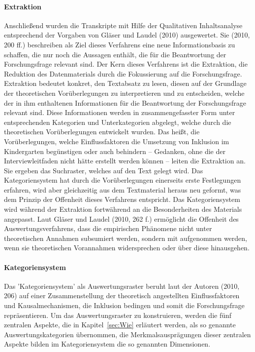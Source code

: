 \paragraph{Extraktion} Anschließend wurden die Transkripte mit Hilfe der Qualitativen Inhaltsanalyse entsprechend der Vorgaben von Gläser und Laudel (2010) ausgewertet. Sie (2010, 200 ff.) beschreiben als  Ziel dieses Verfahrens eine neue Informationsbasis zu schaffen, die nur noch die Aussagen enthält, die für die Beantwortung der Forschungsfrage relevant sind. Der Kern dieses Verfahrens ist die Extraktion, die Reduktion des Datenmaterials durch die Fokussierung auf die Forschungsfrage. Extraktion bedeutet konkret, den Textabsatz zu lesen, diesen auf der Grundlage der theoretischen Vorüberlegungen zu interpretieren und zu entscheiden, welche der in ihm enthaltenen Informationen für die Beantwortung der Forschungsfrage relevant sind. Diese Informationen werden in zusammengefasster Form unter  entsprechenden Kategorien und Unterkategorien abgelegt, welche durch die theoretischen Vorüberlegungen entwickelt wurden. Das heißt, die Vorüberlegungen, welche Einflussfaktoren die Umsetzung von Inklusion im Kindergarten begünstigen oder auch behindern -- Gedanken, ohne die der Interviewleitfaden nicht hätte erstellt werden können -- leiten die Extraktion an. Sie ergeben das Suchraster, welches auf den Text gelegt wird. Das Kategoriensystem hat durch die Vorüberlegungen einerseits erste Festlegungen erfahren, wird aber gleichzeitig aus dem Textmaterial heraus neu geformt, was dem Prinzip der Offenheit dieses Verfahrens entspricht. Das Kategoriensystem wird während der Extraktion fortwährend an die Besonderheiten des Materials angepasst. Laut Gläser und Laudel (2010, 262 f.) ermöglicht die Offenheit des Auswertungsverfahrens, dass die empirischen Phänomene nicht unter theoretischen Annahmen subsumiert werden, sondern mit aufgenommen werden, wenn sie theoretischen Vorannahmen widersprechen oder über diese hinausgehen.

\paragraph{Kategoriensystem}
Das ’Kategoriensystem’ als Auswertungsraster beruht laut der Autoren (2010, 206) auf einer Zusammenstellung der theoretisch angestellten Einflussfaktoren und Kausalmechanismen, die Inklusion bedingen und somit die Forschungsfrage repräsentieren. Um das Auswertungsraster zu konstruieren, werden die fünf zentralen Aspekte, die in Kapitel~\ref{sec:Wie} erläutert werden, als so genannte Auswertungskategorien übernommen, die Merkmalsausprägungen dieser zentralen Aspekte bilden im Kategoriensystem die so genannten Dimensionen. 

